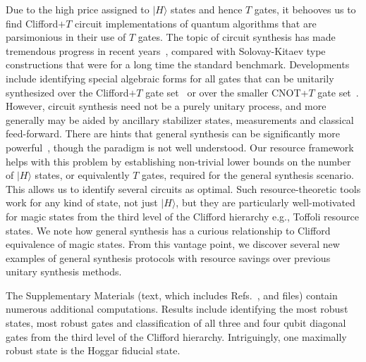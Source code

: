 \documentclass[aps,prl,twocolumn,showpacs,superscriptaddress,groupedaddress,amsmath,amssymb]{revtex4-1}  %
\def\ket #1{\vert #1\rangle}
\begin{document}
Due to the high price assigned to $\ket{H}$ states and hence $T$ gates, it behooves us to find Clifford$+T$ circuit implementations of quantum algorithms that are parsimonious in their use of $T$ gates. The topic of circuit synthesis has made tremendous progress in recent years~\cite{amy_polynomial-time_2014,amy_t-count_2016,gosset_algorithm_2014,bocharov_efficient_2013,duclos-cianci_distillation_2013,paetznick_repeat-until-success:_2014,ross_optimal_2014,selinger_quantum_2013,wiebe_quantum_2016}, compared with  Solovay-Kitaev type constructions that were for a long time the standard benchmark. Developments include identifying special algebraic forms for all gates that can be unitarily synthesized over the Clifford$+T$ gate set~\cite{gosset_algorithm_2014} or over the smaller CNOT+$T$ gate set~\cite{amy_polynomial-time_2014,amy_t-count_2016}. However, circuit synthesis need not be a purely unitary process, and more generally may be aided by ancillary stabilizer states, measurements and classical feed-forward.  There are hints that general synthesis can be significantly more powerful~\cite{duclos-cianci_distillation_2013,jones_low-overhead_2013,paetznick_repeat-until-success:_2014,wiebe_quantum_2016}, though the paradigm is not well understood. Our resource framework helps with this problem by establishing non-trivial lower bounds on the number of $\ket{H}$ states, or equivalently $T$ gates, required for the general synthesis scenario.  This allows us to identify several circuits as optimal. Such resource-theoretic tools work for any kind of state, not just $\ket{H}$, but they are particularly well-motivated for magic states from the third level of the Clifford hierarchy e.g., Toffoli resource states.  We note how general synthesis has a curious relationship to Clifford equivalence of magic states. From this vantage point, we discover several new examples of general synthesis protocols with resource savings over previous unitary synthesis methods. 

 The Supplementary Materials (text, which includes Refs.~\cite{andersson_states_2015,reichardt_quantum_2009,campbell_catalysis_2011,harrow_robustness_2003,van_dam_noise_2011}, and files) contain numerous additional computations. Results include identifying the most robust states, most robust gates and classification of all three and four qubit diagonal gates from the third level of the Clifford hierarchy. Intriguingly, one maximally robust state is the Hoggar \cite{hoggar_64_1998} fiducial state.
\end{document}
